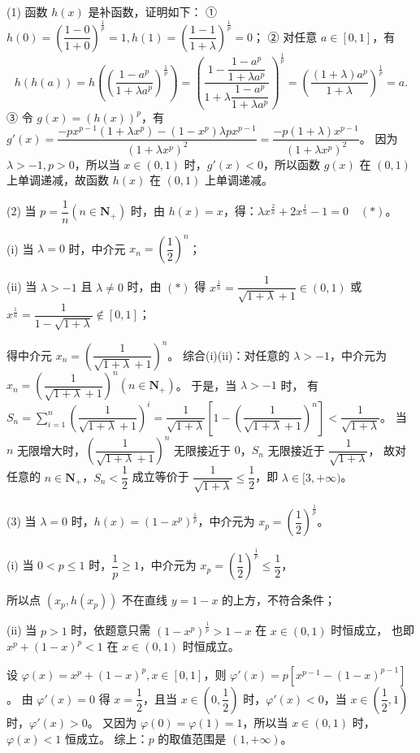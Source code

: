 \begin{solutions}
(1) 函数 $h(x)$ 是补函数，证明如下：
① $h(0)=\left(\dfrac{1-0}{1+0}\right)^{\frac{1}{p}}=1, h(1)=\left(\dfrac{1-1}{1+\lambda}\right)^{\frac{1}{p}}=0$；
② 对任意 $a \in [0,1]$，有
$$
h(h(a))=h\left(\left(\dfrac{1-a^p}{1+\lambda a^p}\right)^{\frac{1}{p}}\right)=\left(\dfrac{1-\dfrac{1-a^p}{1+\lambda a^p}}{1+\lambda \dfrac{1-a^p}{1+\lambda a^p}}\right)^{\frac{1}{p}}=\left(\dfrac{(1+\lambda)a^p}{1+\lambda}\right)^{\frac{1}{p}}=a.
$$
③ 令 $g(x)=(h(x))^p$，有 $g'(x)=\dfrac{-px^{p-1}(1+\lambda x^p)-(1-x^p)\lambda p x^{p-1}}{(1+\lambda x^p)^2}=\dfrac{-p(1+\lambda)x^{p-1}}{(1+\lambda x^p)^2}$。
因为 $\lambda > -1, p > 0$，所以当 $x \in (0,1)$ 时，$g'(x) < 0$，所以函数 $g(x)$ 在 $(0,1)$ 上单调递减，故函数 $h(x)$ 在 $(0,1)$ 上单调递减。

(2) 当 $p=\dfrac{1}{n} (n \in \mathbf{N}_+)$ 时，由 $h(x)=x$，得：$\lambda x^{\frac{2}{n}} + 2x^{\frac{1}{n}} - 1 = 0 \quad (*)$。

(i) 当 $\lambda=0$ 时，中介元 $x_n=\left(\dfrac{1}{2}\right)^n$；

(ii) 当 $\lambda > -1$ 且 $\lambda \neq 0$ 时，由 $(*)$ 得 $x^{\frac{1}{n}}=\dfrac{1}{\sqrt{1+\lambda}+1} \in (0,1)$ 或 $x^{\frac{1}{n}}=\dfrac{1}{1-\sqrt{1+\lambda}} \notin [0,1]$；

得中介元 $x_n=\left(\dfrac{1}{\sqrt{1+\lambda}+1}\right)^n$。
综合(i)(ii)：对任意的 $\lambda > -1$，中介元为 $x_n=\left(\dfrac{1}{\sqrt{1+\lambda}+1}\right)^n (n \in \mathbf{N}_+)$。
于是，当 $\lambda > -1$ 时，
有 $S_n=\sum\limits_{i=1}^n \left(\dfrac{1}{\sqrt{1+\lambda}+1}\right)^i = \dfrac{1}{\sqrt{1+\lambda}}\left[1-\left(\dfrac{1}{\sqrt{1+\lambda}+1}\right)^n\right] < \dfrac{1}{\sqrt{1+\lambda}}$。
当 $n$ 无限增大时，$\left(\dfrac{1}{\sqrt{1+\lambda}+1}\right)^n$ 无限接近于 $0$，$S_n$ 无限接近于 $\dfrac{1}{\sqrt{1+\lambda}}$，
故对任意的 $n \in \mathbf{N}_+$，$S_n < \dfrac{1}{2}$ 成立等价于 $\dfrac{1}{\sqrt{1+\lambda}} \leqslant \dfrac{1}{2}$，即 $\lambda \in [3, +\infty)$。

(3) 当 $\lambda=0$ 时，$h(x)=(1-x^p)^{\frac{1}{p}}$，中介元为 $x_p=\left(\dfrac{1}{2}\right)^{\frac{1}{p}}$。

(i) 当 $0 < p \leqslant 1$ 时，$\dfrac{1}{p} \geqslant 1$，中介元为 $x_p=\left(\dfrac{1}{2}\right)^{\frac{1}{p}} \leqslant \dfrac{1}{2}$，

所以点 $(x_p, h(x_p))$ 不在直线 $y=1-x$ 的上方，不符合条件；

(ii) 当 $p > 1$ 时，依题意只需 $(1-x^p)^{\frac{1}{p}} > 1-x$ 在 $x \in (0,1)$ 时恒成立，
也即 $x^p+(1-x)^p < 1$ 在 $x \in (0,1)$ 时恒成立。

设 $\varphi(x)=x^p+(1-x)^p, x \in [0,1]$，则 $\varphi'(x)=p[x^{p-1}-(1-x)^{p-1}]$。
由 $\varphi'(x)=0$ 得 $x=\dfrac{1}{2}$，且当 $x \in \left(0,\dfrac{1}{2}\right)$ 时，$\varphi'(x) < 0$，当 $x \in \left(\dfrac{1}{2},1\right)$ 时，$\varphi'(x) > 0$。
又因为 $\varphi(0)=\varphi(1)=1$，所以当 $x \in (0,1)$ 时，$\varphi(x) < 1$ 恒成立。
综上：$p$ 的取值范围是 $(1, +\infty)$。
\end{solutions}
